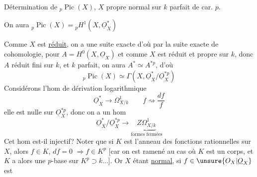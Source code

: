 Détermination de ${}_p\operatorname{Pic}(X)$, $X$ propre normal sur $k$ parfait de car. $p$.

On aura ${}_p\operatorname{Pic}(X)={}_pH^1(X,\underline O_X^*)$

Comme $X$ est \uline{réduit}, on a une suite exacte
d'où par la suite exacte de cohomologie, pour $A=H^0(X,\underline O_X)$
et comme $X$ est réduit et propre sur $k$, donc $A$ réduit
fini  sur $k$, et $k$ parfait, on aura
$A^*\simeq A^{*p}$, d'où
\[
{}_p\operatorname{Pic}(X)\simeq\Gamma(X,\underline O_X^*/\underline O_X^{*p})
\]
Considérons l'hom de dérivation logarithmique
\[
\underline O_X^*\longrightarrow\Omega^1_{X/k}\qquad
f\rightsquigarrow\frac{df}{f}
\]
elle est nulle sur $\underline O_X^{*p}$, donc on a un hom
\[
\underline O_X^*/\underline O_X^{*p}\longrightarrow
\underbrace{Z\Omega^1_{X/k}}_{\text{formes fermées}}
\]
Cet hom est-il injectif? Noter que si $K$ est l'anneau
des fonctions rationnelles sur $X$, alors $f\in K$, $df=0$
$\Rightarrow f\in K^p$ [car  on est ramené au cas où $K$
est un corps, et $K$  a alors une
$p$-base sur $K^p\supset k$...]. Or $X$ étant \uline{normal}, si $f\in\unsure{O_X|\underline O_X}$ est
